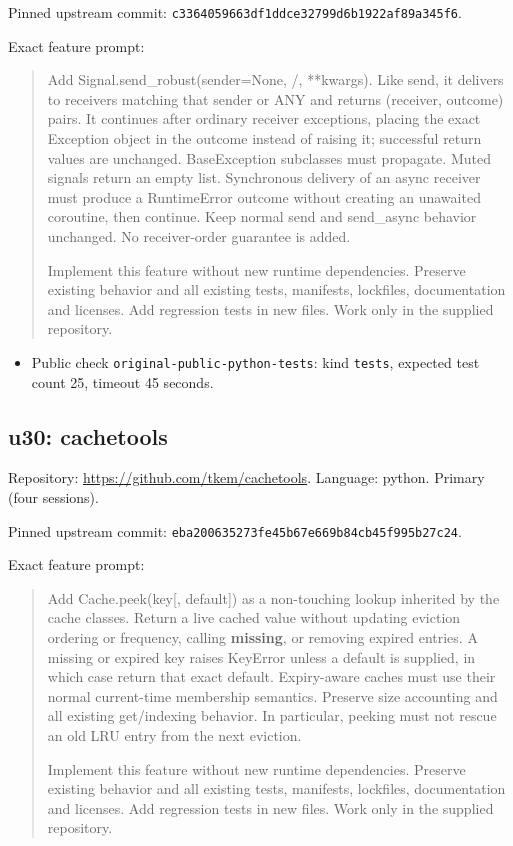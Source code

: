 \documentclass[manuscript,screen,nonacm]{acmart}
\providecommand{\tightlist}{\setlength{\itemsep}{0pt}\setlength{\parskip}{0pt}}
\begin{document}
Pinned upstream commit:
\nolinkurl{c3364059663df1ddce32799d6b1922af89a345f6}.

Exact feature prompt:

\begin{quote}
Add Signal.send\_robust(sender=None, /, **kwargs). Like send, it
delivers to receivers matching that sender or ANY and returns (receiver,
outcome) pairs. It continues after ordinary receiver exceptions, placing
the exact Exception object in the outcome instead of raising it;
successful return values are unchanged. BaseException subclasses must
propagate. Muted signals return an empty list. Synchronous delivery of
an async receiver must produce a RuntimeError outcome without creating
an unawaited coroutine, then continue. Keep normal send and send\_async
behavior unchanged. No receiver-order guarantee is added.

Implement this feature without new runtime dependencies. Preserve
existing behavior and all existing tests, manifests, lockfiles,
documentation and licenses. Add regression tests in new files. Work only
in the supplied repository.
\end{quote}

\begin{itemize}
\tightlist
\item
  Public check \nolinkurl{original-public-python-tests}: kind
  \texttt{tests}, expected test count 25, timeout 45 seconds.
\end{itemize}

\subsection{u30: cachetools}\label{u30-cachetools}

Repository: \url{https://github.com/tkem/cachetools}. Language: python.
Primary (four sessions).

Pinned upstream commit:
\nolinkurl{eba200635273fe45b67e669b84cb45f995b27c24}.

Exact feature prompt:

\begin{quote}
Add Cache.peek(key{[}, default{]}) as a non-touching lookup inherited by
the cache classes. Return a live cached value without updating eviction
ordering or frequency, calling \textbf{missing}, or removing expired
entries. A missing or expired key raises KeyError unless a default is
supplied, in which case return that exact default. Expiry-aware caches
must use their normal current-time membership semantics. Preserve size
accounting and all existing get/indexing behavior. In particular,
peeking must not rescue an old LRU entry from the next eviction.

Implement this feature without new runtime dependencies. Preserve
existing behavior and all existing tests, manifests, lockfiles,
documentation and licenses. Add regression tests in new files. Work only
in the supplied repository.
\end{quote}
\end{document}
